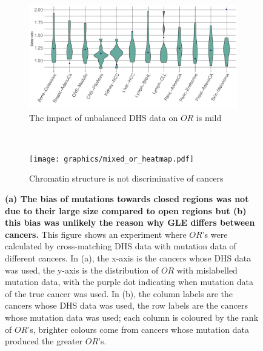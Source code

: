 \begin{figure}[htbp]
    \begin{subfigure}{\textwidth}
    \centering
    \includegraphics[scale=0.55]{graphics/mixed_or_violin.pdf}
    \caption{The impact of unbalanced DHS data on $OR$ is mild}
    \label{fig:mixed_or_violin}
    \end{subfigure} \\
    
    \vspace{0.2cm}
    \begin{subfigure}{\textwidth}
    \centering
    \texttt{[image: graphics/mixed\_or\_heatmap.pdf]}
    \caption{Chromatin structure is not discriminative of cancers}
    \label{fig:mixed_or_heatmap}
    \end{subfigure} 

    \caption{\textbf{(a) The bias of mutations towards closed regions was not due to their large size compared to open regions but (b) this bias was unlikely the reason why GLE differs between cancers.} This figure shows an experiment where $OR$'s were calculated by cross-matching DHS data with mutation data of different cancers. In (a), the x-axis is the cancers whose DHS data was used, the y-axis is the distribution of $OR$ with mislabelled mutation data, with the purple dot indicating when mutation data of the true cancer was used. In (b), the column labels are the cancers whose DHS data was used, the row labels are the cancers whose mutation data was used; each column is coloured by the rank of $OR$'s, brighter colours come from cancers whose mutation data produced the greater $OR$'s.}
    \label{fig:mixed_or}
\end{figure}